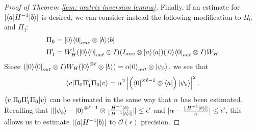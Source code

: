 \documentclass[11pt]{article}
\theoremstyle{definition}
\theoremstyle{remark}
\newcommand\bigoh{\mathcal{O}}
\begin{document}
\begin{proof}[Proof of Theorem \ref{lem: matrix inversion lemma}]
Finally, if an estimate for $|\bra{a} H^{-1} \ket{b}|$ is desired, we can consider instead the following modification to $\Pi_0$ and $\Pi_1$:
\begin{align}
\Pi_0 &= \ket{0}\bra{0}_{anc} \otimes \ket{b}\bra{b} \\
\Pi'_1 &= W_H^\dagger (\ket{0}\bra{0}_{out} \otimes I) (I_{anc} \otimes \ket{a}\bra{a})(\ket{0}\bra{0}_{out} \otimes I) W_H
\end{align}
Since $(\ket{0}\bra{0}_{out} \otimes I) W_H (\ket{0}^{\otimes \ell} \otimes \ket{b}) = \alpha \ket{0}_{out} \otimes \ket{\psi_b}$, we see that 
\begin{equation}
\bra{v}\Pi_0\Pi_1'\Pi_0\ket{v} = \alpha^2\left|\left(\bra{0}^{\otimes \ell-1} \otimes \bra{a}\right) \ket{\psi_b}\right|^2.
\end{equation}
$\bra{v}\Pi_0\Pi_1'\Pi_0\ket{v}$ can be estimated in the same way that $\alpha$ has been estimated. Recalling that $\| \ket{\psi_b} - \ket{0}^{\otimes \ell-1} \otimes \frac{H^{-1}\ket{b}} {\|H^{-1}\ket{b}\|} \| \le \epsilon'$ and $|\alpha - \frac{\|H^{-1}\ket{b}\|}{\kappa}| \le \epsilon'$, this allows us to estimate $|\bra{a} H^{-1} \ket{b}|$ to $\bigoh (\epsilon)$ precision.
\end{proof}




\end{document}
